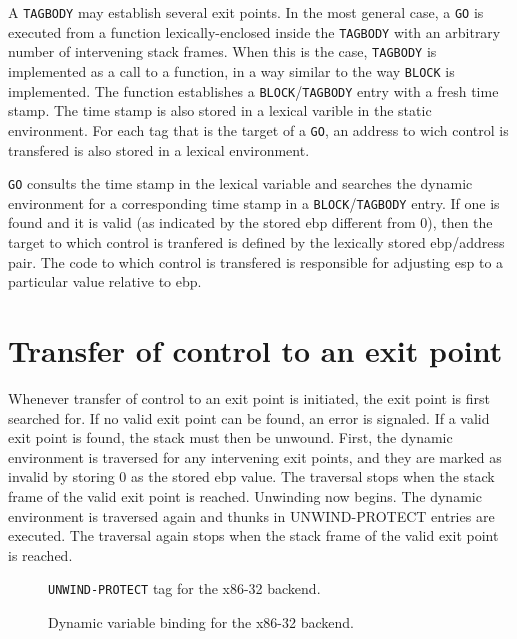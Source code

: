 A \texttt{TAGBODY} may establish several exit points.  In the most
general case, a \texttt{GO} is executed from a function
lexically-enclosed inside the \texttt{TAGBODY} with an arbitrary
number of intervening stack frames.  When this is the case,
\texttt{TAGBODY} is implemented as a call to a function, in a way
similar to the way \texttt{BLOCK} is implemented.  The function
establishes a \texttt{BLOCK}/\texttt{TAGBODY} entry with a fresh time
stamp.  The time stamp is also stored in a lexical varible in the
static environment.  For each tag that is the target of a \texttt{GO},
an address to wich control is transfered is also stored in a lexical
environment.

\texttt{GO} consults the time stamp in the lexical variable and
searches the dynamic environment for a corresponding time stamp in a
\texttt{BLOCK}/\texttt{TAGBODY} entry.  If one is found and it is
valid (as indicated by the stored ebp different from 0), then the
target to which control is tranfered is defined by the lexically
stored ebp/address pair.  The code to which control is transfered is
responsible for adjusting esp to a particular value relative to ebp.

\section{Transfer of control to an exit point}

Whenever transfer of control to an exit point is initiated, the exit
point is first searched for.  If no valid exit point can be found, an
error is signaled.  If a valid exit point is found, the stack must
then be unwound.  First, the dynamic environment is traversed for any
intervening exit points, and they are marked as invalid by storing 0
as the stored ebp value.  The traversal stops when the stack frame of
the valid exit point is reached.  Unwinding now begins.  The dynamic
environment is traversed again and thunks in UNWIND-PROTECT entries
are executed.  The traversal again stops when the stack frame of the
valid exit point is reached.

\begin{figure}
\begin{center}
\end{center}
\caption{\label{fig-x86-32-unwind-protect}
\texttt{UNWIND-PROTECT} tag for the x86-32 backend.}
\end{figure}

\begin{figure}
\begin{center}
\end{center}
\caption{\label{fig-x86-32-dynamic-binding}
Dynamic variable binding for the x86-32 backend.}
\end{figure}

